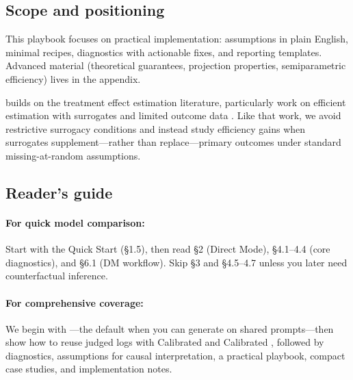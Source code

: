 \subsection{Scope and positioning}

This playbook focuses on practical implementation: assumptions in plain English, minimal recipes, diagnostics with actionable fixes, and reporting templates. Advanced material (theoretical guarantees, projection properties, semiparametric efficiency) lives in the appendix.

\cje{} builds on the treatment effect estimation literature, particularly work on efficient estimation with surrogates and limited outcome data \cite{kallus2024role}. Like that work, we avoid restrictive surrogacy conditions and instead study efficiency gains when surrogates supplement---rather than replace---primary outcomes under standard missing-at-random assumptions.

\subsection{Reader's guide}

\paragraph{For quick model comparison:} Start with the Quick Start (§1.5), then read §2 (Direct Mode), §4.1--4.4 (core diagnostics), and §6.1 (DM workflow). Skip §3 and §4.5--4.7 unless you later need counterfactual inference.

\paragraph{For comprehensive coverage:} We begin with \dm---the default when you can generate on shared prompts---then show how to reuse judged logs with Calibrated \ips{} and Calibrated \dr, followed by diagnostics, assumptions for causal interpretation, a practical playbook, compact case studies, and implementation notes.
